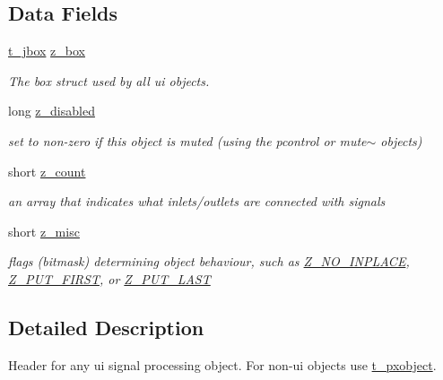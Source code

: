 \subsection*{Data Fields}
\begin{DoxyCompactItemize}
\item 
\hypertarget{structt__pxjbox_a1b7af58c662b5be8836f547a7c3d24ff}{
\hyperlink{structt__jbox}{t\_\-jbox} \hyperlink{structt__pxjbox_a1b7af58c662b5be8836f547a7c3d24ff}{z\_\-box}}
\label{structt__pxjbox_a1b7af58c662b5be8836f547a7c3d24ff}

\begin{DoxyCompactList}\small\item\em The box struct used by all ui objects. \item\end{DoxyCompactList}\item 
\hypertarget{structt__pxjbox_a7ac4bdf0e913aa42f6fd5a729eeeb028}{
long \hyperlink{structt__pxjbox_a7ac4bdf0e913aa42f6fd5a729eeeb028}{z\_\-disabled}}
\label{structt__pxjbox_a7ac4bdf0e913aa42f6fd5a729eeeb028}

\begin{DoxyCompactList}\small\item\em set to non-\/zero if this object is muted (using the pcontrol or mute$\sim$ objects) \item\end{DoxyCompactList}\item 
\hypertarget{structt__pxjbox_a629cc56a14b1a7db41d6f716670c2738}{
short \hyperlink{structt__pxjbox_a629cc56a14b1a7db41d6f716670c2738}{z\_\-count}}
\label{structt__pxjbox_a629cc56a14b1a7db41d6f716670c2738}

\begin{DoxyCompactList}\small\item\em an array that indicates what inlets/outlets are connected with signals \item\end{DoxyCompactList}\item 
\hypertarget{structt__pxjbox_a650e57037167e991696f6f988c442210}{
short \hyperlink{structt__pxjbox_a650e57037167e991696f6f988c442210}{z\_\-misc}}
\label{structt__pxjbox_a650e57037167e991696f6f988c442210}

\begin{DoxyCompactList}\small\item\em flags (bitmask) determining object behaviour, such as \hyperlink{group__msp_ga15695d5ba6bd17ae2e4ac01fff6d2b32}{Z\_\-NO\_\-INPLACE}, \hyperlink{group__msp_gafd451e217e2ffd6b8e158b8861fcf866}{Z\_\-PUT\_\-FIRST}, or \hyperlink{group__msp_ga38363d9e8d77f8f0fcec1a7a1d008977}{Z\_\-PUT\_\-LAST} \item\end{DoxyCompactList}\end{DoxyCompactItemize}


\subsection{Detailed Description}
Header for any ui signal processing object. For non-\/ui objects use \hyperlink{structt__pxobject}{t\_\-pxobject}. 